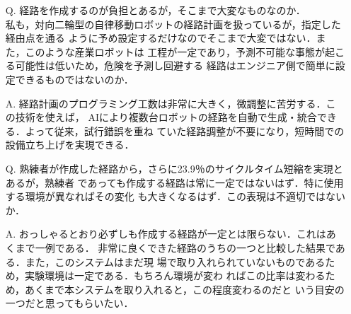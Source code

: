 \documentclass{jsarticle}
\begin{document}
\begin{itemize}
  \addtolength{\itemindent}{5.4zw}
  \item [Q.]経路を作成するのが負担とあるが，そこまで大変なものなのか．\\
  \hspace*{5.5zw}私も，対向二輪型の自律移動ロボットの経路計画を扱っているが，指定した経由点を通る
  \hspace*{5.5zw}ように予め設定するだけなのでそこまで大変ではない．また，このような産業ロボットは
  \hspace*{5.5zw}工程が一定であり，予測不可能な事態が起こる可能性は低いため，危険を予測し回避する
  \hspace*{5.5zw}経路はエンジニア側で簡単に設定できるものではないのか．
  \vspace*{1zh}

  \item [A.]経路計画のプログラミング工数は非常に大きく，微調整に苦労する．この技術を使えば，
  \hspace*{5.5zw}AIにより複数台ロボットの経路を自動で生成・統合できる．よって従来，試行錯誤を重ね
  \hspace*{5.5zw}ていた経路調整が不要になり，短時間での設備立ち上げを実現できる．\\
  \vspace*{1zh}

  \item [Q.]熟練者が作成した経路から，さらに23.9％のサイクルタイム短縮を実現とあるが，熟練者
  \hspace*{5.5zw}であっても作成する経路は常に一定ではないはず．特に使用する環境が異なればその変化
  \hspace*{5.5zw}も大きくなるはず．この表現は不適切ではないか．
  \vspace*{1zh}

  \item [A.]おっしゃるとおり必ずしも作成する経路が一定とは限らない．これはあくまで一例である．
  \hspace*{5.5zw}非常に良くできた経路のうちの一つと比較した結果である．また，このシステムはまだ現
  \hspace*{5.5zw}場で取り入れられていないものであるため，実験環境は一定である．もちろん環境が変わ
  \hspace*{5.5zw}ればこの比率は変わるため，あくまで本システムを取り入れると，この程度変わるのだと
  \hspace*{5.5zw}いう目安の一つだと思ってもらいたい．

  \newpage
  \vspace*{-10zh}


\end{itemize}
\end{document}
